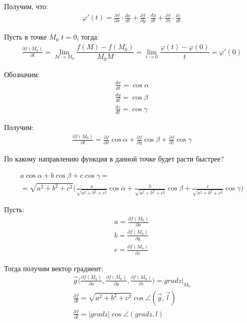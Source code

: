 \documentclass[a4paper,12pt,oneside]{extbook}
\theoremstyle{numbered}
\theoremstyle{unnumbered}
\theoremstyle{named}
\theoremstyle{unnumbered}
\theoremstyle{named}
\theoremstyle{named}
\theoremstyle{named}
\begin{document}
Получим, что:
\begin{gather*}
    \varphi'(t) = \frac{\partial f}{\partial x} \cdot \frac{dx}{dt} + \frac{\partial f}{\partial y} \cdot \frac{dy}{dt} + \frac{\partial f}{\partial z} \cdot \frac{dz}{dt}
\end{gather*}

Пусть в точке \(M_0\) \(t = 0\), тогда:
\begin{gather*}
    \frac{\partial f(M_0)}{\partial l} = \lim_{M \to M_0}{\dfrac{f(M) - f(M_0)}{M_0M}} = \lim_{t \to 0}{\dfrac{\varphi(t) - \varphi(0)}{t}} = \varphi'(0)
\end{gather*}

Обозначим:
\begin{gather*}
    \frac{dx}{dt} = \cos{\alpha} \\
    \frac{dy}{dt} = \cos{\beta} \\
    \frac{dz}{dt} = \cos{\gamma}
\end{gather*}

Получим:
\begin{gather*}
    \frac{\partial f(M_0)}{\partial l} = \frac{\partial f}{\partial x} \cos{\alpha} + \frac{\partial f}{\partial y} \cos{\beta} + \frac{\partial f}{\partial z} \cos{\gamma}
\end{gather*}

По какому направлению функция в данной точке будет расти быстрее?

\begin{gather*}
    a\cos{\alpha} + b\cos{\beta} + c\cos{\gamma} = \\
    = \sqrt{a^2 + b^2 + c^2} \Big( \frac{a}{\sqrt{a^2 + b^2 + c^2}} \cos{\alpha} + \frac{b}{\sqrt{a^2 + b^2 + c^2}} \cos{\beta} + \frac{c}{\sqrt{a^2 + b^2 + c^2}} \cos{\gamma} \Big)
\end{gather*}

Пусть:
\begin{gather*}
    a = \frac{\partial f(M_0)}{\partial x} \\
    b = \frac{\partial f(M_0)}{\partial y} \\
    c = \frac{\partial f(M_0)}{\partial z}
\end{gather*}

Тогда получим вектор градиент:
\begin{gather*}
    \overrightarrow{g} \Big( \frac{\partial f(M_0)}{\partial x}, \frac{\partial f(M_0)}{\partial y}, \frac{\partial f(M_0)}{\partial z} \Big) = grad z \Big|_{M_0} \\
    \frac{\partial f}{\partial l} = \sqrt{a^2 + b^2 + c^2} \cos{\angle(\overrightarrow{g}, \overrightarrow{l})} \\
    \frac{\partial f}{\partial l} = |grad z| \cos{\angle(grad z, l)}
\end{gather*}
\end{document}
